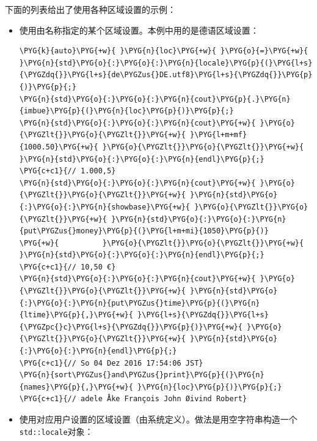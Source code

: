 
下面的列表给出了使用各种区域设置的示例：



\begin{itemize}
\item 使用由名称指定的某个区域设置。本例中用的是德语区域设置：



\begin{codeblockbg}
\begin{Verbatim}[commandchars=\\\{\},breaklines=true,breakanywhere=true,fontsize=\codefont,xleftmargin=17bp]
\PYG{k}{auto}\PYG{+w}{ }\PYG{n}{loc}\PYG{+w}{ }\PYG{o}{=}\PYG{+w}{ }\PYG{n}{std}\PYG{o}{:}\PYG{o}{:}\PYG{n}{locale}\PYG{p}{(}\PYG{l+s}{\PYGZdq{}}\PYG{l+s}{de\PYGZus{}DE.utf8}\PYG{l+s}{\PYGZdq{}}\PYG{p}{)}\PYG{p}{;}
\PYG{n}{std}\PYG{o}{:}\PYG{o}{:}\PYG{n}{cout}\PYG{p}{.}\PYG{n}{imbue}\PYG{p}{(}\PYG{n}{loc}\PYG{p}{)}\PYG{p}{;}
\PYG{n}{std}\PYG{o}{:}\PYG{o}{:}\PYG{n}{cout}\PYG{+w}{ }\PYG{o}{\PYGZlt{}}\PYG{o}{\PYGZlt{}}\PYG{+w}{ }\PYG{l+m+mf}{1000.50}\PYG{+w}{ }\PYG{o}{\PYGZlt{}}\PYG{o}{\PYGZlt{}}\PYG{+w}{ }\PYG{n}{std}\PYG{o}{:}\PYG{o}{:}\PYG{n}{endl}\PYG{p}{;}
\PYG{c+c1}{// 1.000,5}
\PYG{n}{std}\PYG{o}{:}\PYG{o}{:}\PYG{n}{cout}\PYG{+w}{ }\PYG{o}{\PYGZlt{}}\PYG{o}{\PYGZlt{}}\PYG{+w}{ }\PYG{n}{std}\PYG{o}{:}\PYG{o}{:}\PYG{n}{showbase}\PYG{+w}{ }\PYG{o}{\PYGZlt{}}\PYG{o}{\PYGZlt{}}\PYG{+w}{ }\PYG{n}{std}\PYG{o}{:}\PYG{o}{:}\PYG{n}{put\PYGZus{}money}\PYG{p}{(}\PYG{l+m+mi}{1050}\PYG{p}{)}
\PYG{+w}{          }\PYG{o}{\PYGZlt{}}\PYG{o}{\PYGZlt{}}\PYG{+w}{ }\PYG{n}{std}\PYG{o}{:}\PYG{o}{:}\PYG{n}{endl}\PYG{p}{;}
\PYG{c+c1}{// 10,50 €}
\PYG{n}{std}\PYG{o}{:}\PYG{o}{:}\PYG{n}{cout}\PYG{+w}{ }\PYG{o}{\PYGZlt{}}\PYG{o}{\PYGZlt{}}\PYG{+w}{ }\PYG{n}{std}\PYG{o}{:}\PYG{o}{:}\PYG{n}{put\PYGZus{}time}\PYG{p}{(}\PYG{n}{ltime}\PYG{p}{,}\PYG{+w}{ }\PYG{l+s}{\PYGZdq{}}\PYG{l+s}{\PYGZpc{}c}\PYG{l+s}{\PYGZdq{}}\PYG{p}{)}\PYG{+w}{ }\PYG{o}{\PYGZlt{}}\PYG{o}{\PYGZlt{}}\PYG{+w}{ }\PYG{n}{std}\PYG{o}{:}\PYG{o}{:}\PYG{n}{endl}\PYG{p}{;}
\PYG{c+c1}{// So 04 Dez 2016 17:54:06 JST}
\PYG{n}{sort\PYGZus{}and\PYGZus{}print}\PYG{p}{(}\PYG{n}{names}\PYG{p}{,}\PYG{+w}{ }\PYG{n}{loc}\PYG{p}{)}\PYG{p}{;}
\PYG{c+c1}{// adele Åke François John Øivind Robert}
\end{Verbatim}
\end{codeblockbg}



\item 使用对应用户设置的区域设置（由系统定义）。做法是用空字符串构造一个\texttt{std::\allowbreak{}locale}对象：



\end{itemize}
